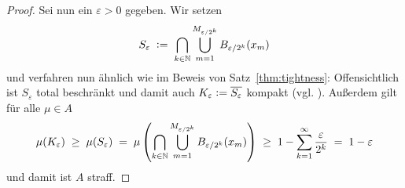 \documentclass[../main/main.tex]{subfiles}
\begin{document}
\begin{proof}
		Sei nun ein $\varepsilon > 0$ gegeben. Wir setzen 
		\[ S_\varepsilon 
			\; \vcentcolon = \; \bigcap_{k \in \mathbb{N}} \bigcup_{m=1}^{M_{\varepsilon / 2^k}} 
			B_{\varepsilon / 2^k}(x_m) \]
		und verfahren nun ähnlich wie im Beweis von Satz~\ref{thm:tightness}: Offensichtlich ist $S_\varepsilon$ total beschränkt und damit auch 
		$ K_\varepsilon \vcentcolon = \overline{S_\varepsilon}$ kompakt (vgl. \cite[Satz 2.3.8]{Simon.2015}). 
		Außerdem gilt für alle $\mu \in A$
		\[
			\mu(K_\varepsilon) \; \geq \; \mu(S_\varepsilon) \; = \; \mu\left(\bigcap_{k \in \mathbb{N}} \bigcup_{m=1}^{M_{\varepsilon / 2^k}} 
										B_{\varepsilon / 2^k}(x_m)\right)
			                      \; \geq \; 1 - \sum_{k=1}^{\infty} \frac{\varepsilon}{2^k} \; = \; 1 - \varepsilon
		\]
		und damit ist $A$ straff.
	\end{proof}
	
\end{document}
